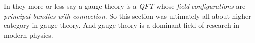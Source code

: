 \\\\
In \cite{wiki-nlab0000} they more or less say a gauge theory is a \textit{QFT} whose \textit{field configurations} are \textit{principal bundles with connection}. So this section was ultimately all about higher category in gauge theory. And gauge theory is a dominant field of research in modern physics.
